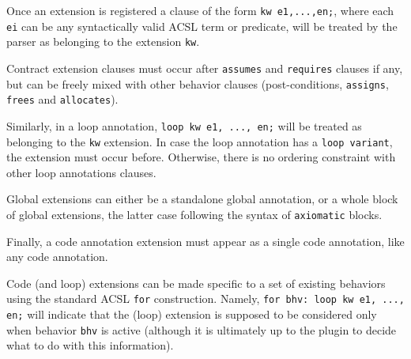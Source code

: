 Once an extension is registered a clause of the form \verb|kw e1,...,en;|, where each \verb|ei| can be
any syntactically valid ACSL term or predicate, will be treated by the parser as belonging to the
extension \verb|kw|.

Contract extension clauses must occur after \verb|assumes| and \verb|requires| clauses if any, but
can be freely mixed with other behavior clauses (post-conditions, \verb|assigns|, \verb|frees| and
\verb|allocates|).

Similarly, in a loop annotation, \verb|loop kw e1, ..., en;| will be treated as belonging to the
\verb|kw| extension. In case the loop annotation has a \verb|loop variant|, the extension must
occur before. Otherwise, there is no ordering constraint with other loop annotations clauses.

Global extensions can either be a standalone global annotation, or a whole block
of global extensions, the latter case following the syntax of
\texttt{axiomatic} blocks.

Finally, a code annotation extension must appear as a single code annotation, like any code annotation.

Code (and loop) extensions can be made specific to a
set of existing behaviors using the standard ACSL \verb|for| construction.
Namely, \verb|for bhv: loop kw e1, ..., en;| will indicate that the
(loop) extension is supposed to be considered only when behavior \verb|bhv| is
active (although it is ultimately up to the plugin to decide what to do with
this information).


